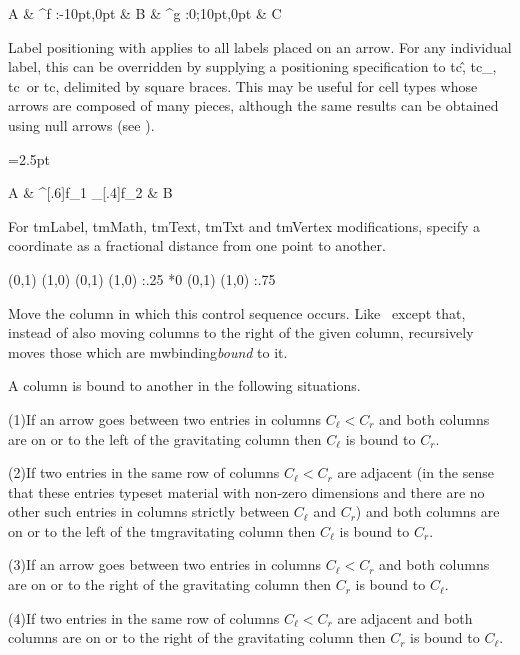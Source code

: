 \eg
\Diagram A & \rTo ^f :{-10pt,0pt} & B & \rTo ^g :{0;10pt,0pt} & C \\
\endDiagram
\endeg

Label positioning with \ch\: applies to all labels placed on an arrow.
For any individual label, this can be overridden by supplying a
positioning specification to \index tc\^, \index tc\_,
\index tc\<\ or \index tc\>,
delimited by square braces.
This may be useful for cell types whose arrows are composed of many pieces,
although the same results can be obtained using null arrows (see \csq\nl).

\side
{}
\def\Adjbox#1{\vcenter{\offinterlineskip\dimen0=#1
   \hbox to #1{\leftarrowfill\hskip.2\dimen0} \hbox to #1{\hskip.2\dimen0\rightarrowfill}}}
=2.5pt

\Diagram A & \rAdj ^[.6]{f_1} _[.4]{f_2} & B \\
\endDiagram
\endside
\endentry

\mod{}
For \index tm{Label}, \index tm{Math}, \index tm{Text}, \index tm{Txt}
and \index tm{Vertex} modifications, specify a coordinate as a fractional
distance from one point to another.

{
\side
\Graph{15mm}{15mm}
\Line (0,1) (1,0)
 (0,1) (1,0) :{.25} *0
\Math\bullet (0,1) (1,0) :{.75}
\endGraph
\endside
}
\endentry

Move the column in which this control sequence occurs.
Like \csq\dl\ except that, instead of also moving columns to
the right of the given column, recursively moves those which are
\sindex mw{binding}\emph{bound} to it.

A column is bound to another in the following situations.

{\parindent=30pt
\item{(1)}If an arrow goes between two entries in columns $C_\ell <
C_r$ and both columns are on or to the left of the
gravitating column then $C_\ell$ is bound to $C_r$.
\item{(2)}If two entries in the same row of columns $C_\ell < C_r$
are adjacent (in the sense that these entries typeset material with
non-zero dimensions and there are no other such entries in columns
strictly between $C_\ell$ and $C_r$) and both columns are on or to the
left of the \index tm{gravitating column} then $C_\ell$ is bound to
$C_r$.
\item{(3)}If an arrow goes between two entries in columns $C_\ell <
C_r$ and both columns are on or to the right of the gravitating column
then $C_r$ is bound to $C_\ell$.
\item{(4)}If two entries in the same row of columns $C_\ell < C_r$
are adjacent and both columns are on or to the right of the
gravitating column then $C_r$ is bound to $C_\ell$.
\par}

